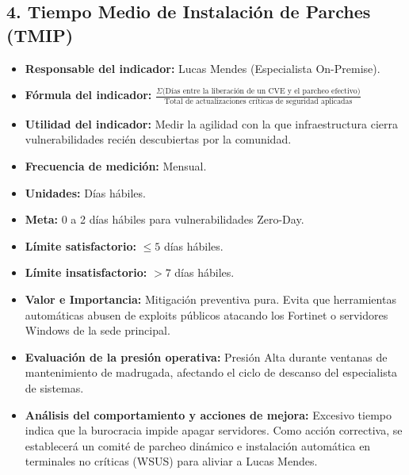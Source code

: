 \documentclass[11pt,a4paper]{article}
\begin{document}
\subsection{4. Tiempo Medio de Instalación de Parches (TMIP)}
\begin{itemize}[label={--}, itemsep=0.1cm]
    \item \textbf{Responsable del indicador:} Lucas Mendes (Especialista On-Premise).
    \item \textbf{Fórmula del indicador:} $\frac{\Sigma \text{(Días entre la liberación de un CVE y el parcheo efectivo)}}{\text{Total de actualizaciones críticas de seguridad aplicadas}}$
    \item \textbf{Utilidad del indicador:} Medir la agilidad con la que infraestructura cierra vulnerabilidades recién descubiertas por la comunidad.
    \item \textbf{Frecuencia de medición:} Mensual.
    \item \textbf{Unidades:} Días hábiles.
    \item \textbf{Meta:} 0 a 2 días hábiles para vulnerabilidades Zero-Day.
    \item \textbf{Límite satisfactorio:} $\leq 5$ días hábiles.
    \item \textbf{Límite insatisfactorio:} $> 7$ días hábiles.
    \item \textbf{Valor e Importancia:} Mitigación preventiva pura. Evita que herramientas automáticas abusen de exploits públicos atacando los Fortinet o servidores Windows de la sede principal.
    \item \textbf{Evaluación de la presión operativa:} Presión Alta durante ventanas de mantenimiento de madrugada, afectando el ciclo de descanso del especialista de sistemas.
    \item \textbf{Análisis del comportamiento y acciones de mejora:} Excesivo tiempo indica que la burocracia impide apagar servidores. Como acción correctiva, se establecerá un comité de parcheo dinámico e instalación automática en terminales no críticas (WSUS) para aliviar a Lucas Mendes.
\end{itemize}
\end{document}

